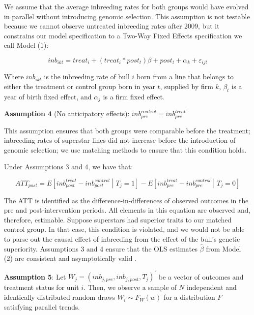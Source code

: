\documentclass[12pt,letterpaper]{article}
\begin{document}
We assume that the average inbreeding rates for both groups would have evolved in parallel without introducing genomic selection. This assumption is not testable because we cannot observe untreated inbreeding rates after 2009, but it constrains our model specification to a Two-Way Fixed Effects specification we call Model (1):

\begin{equation}
inb_{ikt} = treat_{i}+(treat_{i}*post_{t})\beta+post_{t}+\alpha_{k}+\varepsilon_{ijt}\tag{Model 1}
\end{equation}

Where $inb_{ikt}$ is the inbreeding rate of bull $i$ born from a line that belongs to either the treatment or control group born in year $t$, supplied by firm $k$, $\beta_{t}$ is a year of birth fixed effect, and $\alpha_{j}$ is a firm fixed effect. 

\medskip
\textbf{Assumption 4} (No anticipatory effects): $inb_{pre}^{control}=inb_{pre}^{treat}$

This assumption ensures that both groups were comparable before the treatment; inbreeding rates of superstar lines did not increase before the introduction of genomic selection; we use matching methods to ensure that this condition holds. 

Under Assumptions 3 and 4, we have that:

\begin{equation}
    ATT_{post}=E\left[inb_{post}^{treat}-inb_{post}^{control} \middle| T_{j}=1\right]-E\left[inb_{pre}^{treat}-inb_{pre}^{control} \middle| T_{j}=0\right]
\end{equation}

The ATT is identified as the difference-in-differences of observed outcomes in the pre and post-intervention periods. All elements in this equation are observed and, therefore, estimable. Suppose superstars had superior traits to our matched control group. In that case, this condition is violated, and we would not be able to parse out the causal effect of inbreeding from the effect of the bull's genetic superiority. Assumptions 3 and 4 ensure that the OLS estimates $\hat{\beta}$ from Model (2) are consistent and asymptotically valid \citep{Roth2023}.

\medskip
\textbf{Assumption 5}: Let $W_{j}=(inb_{j,pre}, inb_{j,post}, T_{j})^{'}$ be a vector of outcomes and treatment status for unit $i$. Then, we observe a sample of $N$  independent and identically distributed random draws $W_{i}\sim F_{W}(w)$ for a distribution $F$ satisfying parallel trends.
\end{document}
